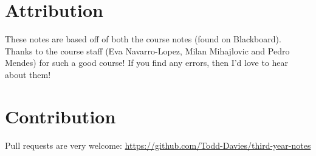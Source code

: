 \section*{Attribution}

These notes are based off of both the course notes (found on
Blackboard). Thanks to the course staff (Eva Navarro-Lopez, Milan
Mihajlovic and Pedro Mendes) for such a good course! If you find any
errors, then I'd love to hear about them!

\section*{Contribution}

Pull requests are very welcome:
\url{https://github.com/Todd-Davies/third-year-notes}
